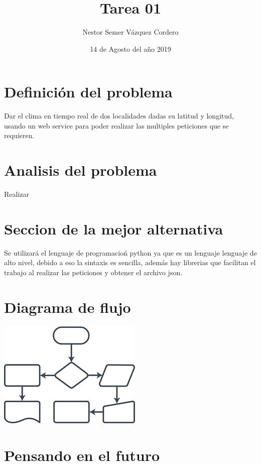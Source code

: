 \documentclass{article}
\title{Tarea 01}
\author{Nestor Semer V\'azquez Cordero}
\date{14 de Agosto del a\~no 2019}
\begin{document}

\maketitle

\section{Definici\'on del problema}

Dar el clima en tiempo real de dos localidades dadas su latitud y longitud, 
usando un web service para poder realizar las multiples peticiones que se requieren.

\section{Analisis del problema}
Realizar 
\section{Seccion de la mejor alternativa}

Se utilizar\'a el lenguaje de programacio\'n python ya que es un lenguaje lenguaje de alto nivel, 
debido a eso la sintaxis es sencilla, adem\'as  hay librerias que facilitan el trabajo al realizar las peticiones y obtener el archivo json.

\section{Diagrama de flujo }
\includegraphics{diagrama}
\section{Pensando en el futuro}
\end{document}
